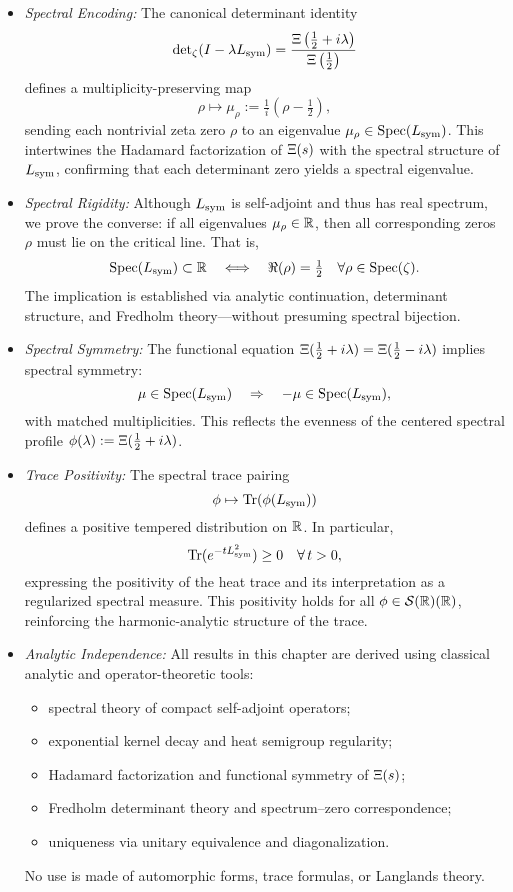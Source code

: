 \begin{itemize}
  \item \textit{Spectral Encoding:}  
  The canonical determinant identity
  \[
  \det\nolimits_{\zeta}(I - \lambda L_{\mathrm{sym}}) = \frac{\Xi\left(\tfrac{1}{2} + i\lambda\right)}{\Xi\left(\tfrac{1}{2}\right)}
  \]
  defines a multiplicity-preserving map
  \[
  \rho \mapsto \mu_\rho := \tfrac{1}{i}(\rho - \tfrac{1}{2}),
  \]
  sending each nontrivial zeta zero \( \rho \) to an eigenvalue \( \mu_\rho \in \operatorname{Spec}(L_{\mathrm{sym}}) \). This intertwines the Hadamard factorization of \( \Xi(s) \) with the spectral structure of \( L_{\mathrm{sym}} \), confirming that each determinant zero yields a spectral eigenvalue.

  \item \textit{Spectral Rigidity:}  
  Although \( L_{\mathrm{sym}} \) is self-adjoint and thus has real spectrum, we prove the converse: if all eigenvalues \( \mu_\rho \in \mathbb{R} \), then all corresponding zeros \( \rho \) must lie on the critical line. That is,
  \[
  \operatorname{Spec}(L_{\mathrm{sym}}) \subset \mathbb{R}
  \quad \Longleftrightarrow \quad
  \Re(\rho) = \tfrac{1}{2} \quad \forall \rho \in \operatorname{Spec}(\zeta).
  \]
  The implication is established via analytic continuation, determinant structure, and Fredholm theory—without presuming spectral bijection.

  \item \textit{Spectral Symmetry:}  
  The functional equation \( \Xi(\tfrac{1}{2} + i\lambda) = \Xi(\tfrac{1}{2} - i\lambda) \) implies spectral symmetry:
  \[
  \mu \in \operatorname{Spec}(L_{\mathrm{sym}}) \quad \Rightarrow \quad -\mu \in \operatorname{Spec}(L_{\mathrm{sym}}),
  \]
  with matched multiplicities. This reflects the evenness of the centered spectral profile \( \phi(\lambda) := \Xi(\tfrac{1}{2} + i\lambda) \).

  \item \textit{Trace Positivity:}  
  The spectral trace pairing
  \[
  \phi \mapsto \operatorname{Tr}(\phi(L_{\mathrm{sym}}))
  \]
  defines a positive tempered distribution on \( \mathbb{R} \). In particular,
  \[
  \operatorname{Tr}(e^{-t L_{\mathrm{sym}}^2}) \ge 0 \quad \forall\, t > 0,
  \]
  expressing the positivity of the heat trace and its interpretation as a regularized spectral measure. This positivity holds for all \( \phi \in \mathcal{S}(\mathbb{R})(\mathbb{R}) \), reinforcing the harmonic-analytic structure of the trace.

  \item \textit{Analytic Independence:}  
  All results in this chapter are derived using classical analytic and operator-theoretic tools:
  \begin{itemize}
    \item spectral theory of compact self-adjoint operators;
    \item exponential kernel decay and heat semigroup regularity;
    \item Hadamard factorization and functional symmetry of \( \Xi(s) \);
    \item Fredholm determinant theory and spectrum–zero correspondence;
    \item uniqueness via unitary equivalence and diagonalization.
  \end{itemize}
  No use is made of automorphic forms, trace formulas, or Langlands theory.
\end{itemize}
